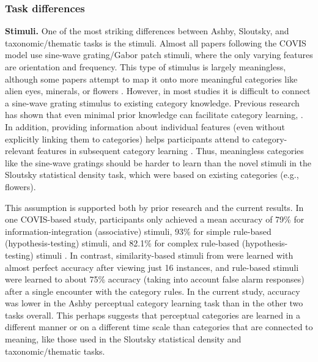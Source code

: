 \documentclass[../dissertation.tex]{subfiles}
\begin{document}
\subsubsection{Task differences}

\textbf{Stimuli.} One of the most striking differences between Ashby, Sloutsky, and taxonomic/thematic tasks is the stimuli. Almost all papers following the COVIS model use sine-wave grating/Gabor patch stimuli, where the only varying features are orientation and frequency. This type of stimulus is largely meaningless, although some papers attempt to map it onto more meaningful categories like alien eyes, minerals, or flowers \citep{Tolins2015, Perry2014}. However, in most studies it is difficult to connect a sine-wave grating stimulus to existing category knowledge. Previous research has shown that even minimal prior knowledge can facilitate category learning, \citep{Kaplan2000}. In addition, providing information about individual features (even without explicitly linking them to categories) helps participants attend to category-relevant features in subsequent category learning \citep{Kim2011}. Thus, meaningless categories like the sine-wave gratings should be harder to learn than the novel stimuli in the Sloutsky statistical density task, which were based on existing categories (e.g., flowers). \par
	This assumption is supported both by prior research and the current results. In one COVIS-based study, participants only achieved a mean accuracy of 79\% for information-integration (associative) stimuli, 93\% for simple rule-based (hypothesis-testing) stimuli, and 82.1\% for complex rule-based (hypothesis-testing) stimuli \citep{Helie2010}. In contrast, similarity-based stimuli from \citet{Kloos2008} were learned with almost perfect accuracy after viewing just 16 instances, and rule-based stimuli were learned to about 75\% accuracy (taking into account false alarm responses) after a single encounter with the category rules. In the current study, accuracy was lower in the Ashby perceptual category learning task than in the other two tasks overall. This perhaps suggests that perceptual categories are learned in a different manner or on a different time scale than categories that are connected to meaning, like those used in the Sloutsky statistical density and taxonomic/thematic tasks. \par
\end{document}
